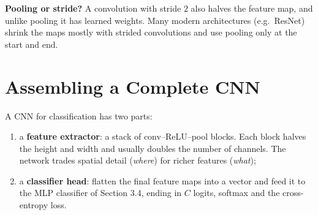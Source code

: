 \documentclass[12pt, a4paper]{article}
\begin{document}
\begin{notebox}
  \textbf{Pooling or stride?} A convolution with stride $2$ also halves the
  feature map, and unlike pooling it has learned weights. Many modern
  architectures (e.g.\ ResNet) shrink the maps mostly with strided
  convolutions and use pooling only at the start and end.
\end{notebox}

\section{Assembling a Complete CNN}

A CNN for classification has two parts:
\begin{enumerate}
  \item a \textbf{feature extractor}: a stack of conv--ReLU--pool blocks.
        Each block halves the height and width and usually doubles the number
        of channels. The network trades spatial detail (\emph{where}) for
        richer features (\emph{what});
  \item a \textbf{classifier head}: flatten the final feature maps into a
        vector and feed it to the MLP classifier of Section 3.4, ending in
        $C$ logits, softmax and the cross-entropy loss.
\end{enumerate}
\end{document}
